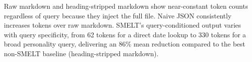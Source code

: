 \documentclass[11pt,a4paper]{article}
\begin{document}
Raw markdown and heading-stripped markdown show near-constant token counts regardless of query because they inject the full file. Naive JSON consistently increases tokens over raw markdown. SMELT's query-conditioned output varies with query specificity, from 62 tokens for a direct date lookup to 330 tokens for a broad personality query, delivering an 86\% mean reduction compared to the best non-SMELT baseline (heading-stripped markdown).
\end{document}
